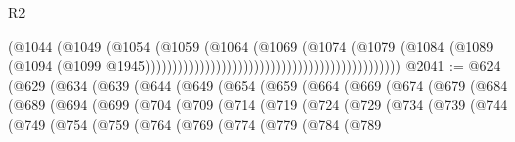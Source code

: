 \begin{lexlean}{R2}
\begin{coremodule}
                                                                          (@1044
                                                                            (@1049
                                                                              (@1054
                                                                                (@1059
                                                                                  (@1064
                                                                                    (@1069
                                                                                      (@1074
                                                                                        (@1079
                                                                                          (@1084
                                                                                            (@1089
                                                                                              (@1094
                                                                                                (@1099
                                                                                                  @1945)))))))))))))))))))))))))))))))))))))))))))))))
@2041 := @624
    (@629
      (@634
        (@639
          (@644
            (@649
              (@654
                (@659
                  (@664
                    (@669
                      (@674
                        (@679
                          (@684
                            (@689
                              (@694
                                (@699
                                  (@704
                                    (@709
                                      (@714
                                        (@719
                                          (@724
                                            (@729
                                              (@734
                                                (@739
                                                  (@744
                                                    (@749
                                                      (@754
                                                        (@759
                                                          (@764
                                                            (@769
                                                              (@774
                                                                (@779
                                                                  (@784
                                                                    (@789

\end{coremodule}
\end{lexlean}
